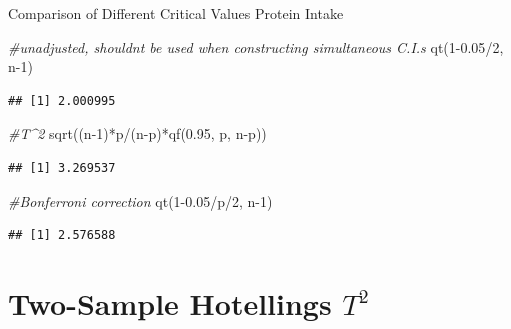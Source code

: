 \documentclass[
  ignorenonframetext,
]{beamer}
\newenvironment{Shaded}{\begin{snugshade}}{\end{snugshade}}
\newcommand{\CommentTok}[1]{\textcolor[rgb]{0.56,0.35,0.01}{\textit{#1}}}
\newcommand{\DecValTok}[1]{\textcolor[rgb]{0.00,0.00,0.81}{#1}}
\newcommand{\FloatTok}[1]{\textcolor[rgb]{0.00,0.00,0.81}{#1}}
\newcommand{\FunctionTok}[1]{\textcolor[rgb]{0.00,0.00,0.00}{#1}}
\newcommand{\NormalTok}[1]{#1}
\newcommand{\SpecialCharTok}[1]{\textcolor[rgb]{0.00,0.00,0.00}{#1}}
\begin{document}
\begin{frame}[fragile]{Comparison of Different Critical Values Protein
Intake}
\protect\hypertarget{comparison-of-different-critical-values-protein-intake}{}
\tiny

\begin{Shaded}
\begin{Highlighting}[]
\CommentTok{\#unadjusted, shouldn\textquotesingle{}t be used when constructing simultaneous C.I.s}
\FunctionTok{qt}\NormalTok{(}\DecValTok{1}\FloatTok{{-}0.05}\SpecialCharTok{/}\DecValTok{2}\NormalTok{, n}\DecValTok{{-}1}\NormalTok{)}
\end{Highlighting}
\end{Shaded}

\begin{verbatim}
## [1] 2.000995
\end{verbatim}

\begin{Shaded}
\begin{Highlighting}[]
\CommentTok{\#T\^{}2}
\FunctionTok{sqrt}\NormalTok{((n}\DecValTok{{-}1}\NormalTok{)}\SpecialCharTok{*}\NormalTok{p}\SpecialCharTok{/}\NormalTok{(n}\SpecialCharTok{{-}}\NormalTok{p)}\SpecialCharTok{*}\FunctionTok{qf}\NormalTok{(}\FloatTok{0.95}\NormalTok{, p, n}\SpecialCharTok{{-}}\NormalTok{p))}
\end{Highlighting}
\end{Shaded}

\begin{verbatim}
## [1] 3.269537
\end{verbatim}

\begin{Shaded}
\begin{Highlighting}[]
\CommentTok{\#Bonferroni correction}
\FunctionTok{qt}\NormalTok{(}\DecValTok{1}\FloatTok{{-}0.05}\SpecialCharTok{/}\NormalTok{p}\SpecialCharTok{/}\DecValTok{2}\NormalTok{, n}\DecValTok{{-}1}\NormalTok{)}
\end{Highlighting}
\end{Shaded}

\begin{verbatim}
## [1] 2.576588
\end{verbatim}

\normalsize
\end{frame}

\hypertarget{two-sample-hotellings-t2}{%
\section{\texorpdfstring{Two-Sample Hotellings
\(T^2\)}{Two-Sample Hotellings T\^{}2}}\label{two-sample-hotellings-t2}}
\end{document}

